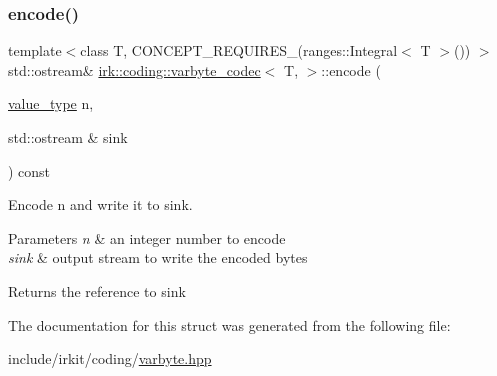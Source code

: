 \subsubsection{\texorpdfstring{encode()}{encode()}}
{\footnotesize\ttfamily template$<$class T, C\+O\+N\+C\+E\+P\+T\+\_\+\+R\+E\+Q\+U\+I\+R\+E\+S\+\_\+(ranges\+::\+Integral$<$ T $>$()) $>$ \\
std\+::ostream\& \mbox{\hyperlink{structirk_1_1coding_1_1varbyte__codec}{irk\+::coding\+::varbyte\+\_\+codec}}$<$ T, $>$\+::encode (\begin{DoxyParamCaption}\item[{\mbox{\hyperlink{structirk_1_1coding_1_1varbyte__codec_addad40df722d08275853597cbe8e178b}{value\+\_\+type}}}]{n,  }\item[{std\+::ostream \&}]{sink }\end{DoxyParamCaption}) const\hspace{0.3cm}{\ttfamily [inline]}}



Encode {\ttfamily n} and write it to {\ttfamily sink}. 


\begin{DoxyParams}{Parameters}
{\em n} & an integer number to encode \\
\hline
{\em sink} & output stream to write the encoded bytes \\
\hline
\end{DoxyParams}
\begin{DoxyReturn}{Returns}
the reference to {\ttfamily sink} 
\end{DoxyReturn}


The documentation for this struct was generated from the following file\+:\begin{DoxyCompactItemize}
\item 
include/irkit/coding/\mbox{\hyperlink{varbyte_8hpp}{varbyte.\+hpp}}\end{DoxyCompactItemize}
